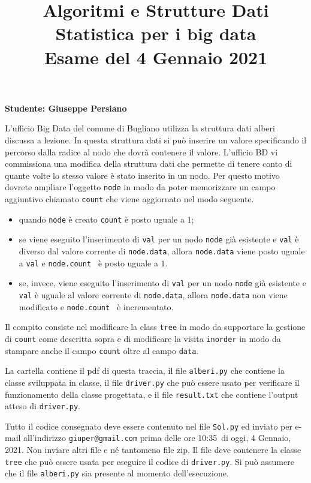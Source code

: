 \documentclass{amsart}
\begin{document}
\title{Algoritmi e Strutture Dati\\
Statistica per i big data\\
Esame del 4 Gennaio 2021
}


\newcommand{\NomeStudente}{Giuseppe Persiano}
\newcommand{\nomeClasse}{{\tt{Sol}}}
\newcommand{\nomeMetodo}{{\tt{nuovo}}}
\newcommand{\oraconsegna}{10:35}
\newcommand{\dataoggi}{4 Gennaio, 2021}


\maketitle

\hfill{{\bf Studente: \NomeStudente}}

\smallskip
L'ufficio Big Data del comune di Bugliano utilizza la struttura dati alberi
discussa a lezione.
In questa struttura dati si pu\`o inserire un valore specificando
il percorso dalla radice al nodo che dovr\`a contenere il valore.
L'ufficio BD vi commissiona una modifica della struttura dati che permette
di tenere conto di quante volte lo stesso valore \`e stato inserito in
un nodo. Per questo motivo dovrete ampliare l'oggetto {\tt node} in modo
da poter memorizzare un campo aggiuntivo chiamato {\tt count} che
viene aggiornato nel modo seguente.
\begin{itemize}
\item quando {\tt node} \`e creato {\tt count} \`e posto uguale a $1$;
\item se viene eseguito l'inserimento di {\tt val} per un
nodo {\tt node} gi\`a esistente e {\tt val} \`e diverso dal valore corrente
di {\tt node.data}, allora
{\tt node.data} viene posto uguale a {\tt val} e {\tt node.count } 
\`e posto uguale a $1$.
\item se, invece, viene eseguito l'inserimento di {\tt val} per un
nodo {\tt node} gi\`a esistente e {\tt val} \`e uguale al valore corrente
di {\tt node.data}, allora
{\tt node.data} non viene modificato e  {\tt node.count } 
\`e incrementato.
\end{itemize}

Il compito consiste nel modificare la class {\tt tree}
in modo da supportare la gestione di {\tt count} come descritta sopra
e di modificare la visita {\tt inorder} in modo
da stampare anche il campo {\tt count} oltre al campo {\tt data}.


\medskip{}
La cartella contiene il pdf di questa traccia, il file
{\tt alberi.py} che contiene la classe sviluppata in classe,
il file {\tt driver.py} che pu\`o essere usato
per verificare il funzionamento della classe progettata, e il file  {\tt result.txt} che contiene
l'output atteso di {\tt driver.py}.

\medskip{}
Tutto il codice consegnato deve essere contenuto nel file
{\tt Sol.py} ed inviato per e-mail all'indirizzo
{\tt giuper@gmail.com} prima delle ore \oraconsegna\ di oggi, 
\dataoggi. Non inviare altri file e n\'e tantomeno file zip.
Il file deve contenere la classe {\tt tree}  
che pu\`o essere usata per eseguire
il codice di {\tt driver.py}. Si pu\`o assumere che il file
{\tt alberi.py} sia presente al momento dell'esecuzione. 
\end{document}
